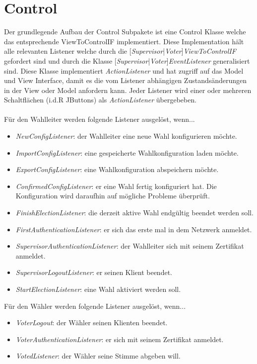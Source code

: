 \documentclass[parskip=full]{scrartcl}
\begin{document}
	\newpage

	\section{Control}
	Der grundlegende Aufbau der Control Subpakete ist eine Control Klasse welche das entsprechende ViewToControlIF implementiert. Diese Implementation hält alle relevanten Listener welche durch die [\textit{Supervisor}|\textit{Voter}]\textit{ViewToControlIF} gefordert sind und durch die Klasse [\textit{Supervisor}|\textit{Voter}]\textit{EventListener} generalisiert sind. Diese Klasse implementiert \textit{ActionListener} und hat zugriff auf das Model und View Interface, damit es die vom Listener abhängigen Zustandsänderungen in der View oder Model anfordern kann. Jeder Listener wird einer oder mehreren Schaltflächen (i.d.R JButtons) als \textit{ActionListener} übergebeben.\\
	\\
	Für den Wahlleiter werden folgende Listener ausgelöst, wenn...
	\begin{itemize}
		\item\textit{NewConfigListener}: der Wahlleiter eine neue Wahl konfigurieren möchte.
		\item\textit{ImportConfigListener}: eine gespeicherte Wahlkonfiguration laden möchte.
		\item\textit{ExportConfigListener}: eine Wahlkonfiguration abspeichern möchte.
		\item\textit{ConfirmedConfigListener}: er eine Wahl fertig konfiguriert hat. Die Konfiguration wird daraufhin auf mögliche Probleme überprüft.
		\item\textit{FinishElectionListener}: die derzeit aktive Wahl endgültig beendet werden soll. 
		\item\textit{FirstAuthenticationListener}: er sich das erste mal in dem Netzwerk anmeldet.
		\item\textit{SupervisorAuthenticationListener}: der Wahlleiter sich mit seinem Zertifikat anmeldet.
		\item\textit{SupervisorLogoutListener}: er seinen Klient beendet.
		\item\textit{StartElectionListener}: eine Wahl aktiviert werden soll.
	\end{itemize}
	
	Für den Wähler werden folgende Listener ausgelöst, wenn...
	\begin{itemize}
		\item\textit{VoterLogout}: der Wähler seinen Klienten beendet.
		\item\textit{VoterAuthenticationListener}: er sich mit seinem Zertifikat anmeldet.
		\item\textit{VotedListener}: der Wähler seine Stimme abgeben will.
	\end{itemize}
\end{document}
